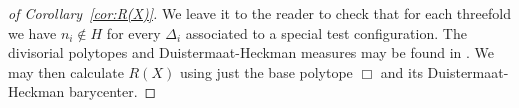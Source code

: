 \begin{proof}[of Corollary~\ref{cor:R(X)}]
We leave it to the reader to check that for each threefold we have \(n_i \notin H\) for every \(\Delta_i\) associated to a special test configuration. The divisorial polytopes and Duistermaat-Heckman measures may be found in \cite{suss2013fano}. We may then calculate \(R(X)\) using just the base polytope \(\Box\) and its Duistermaat-Heckman barycenter.
\end{proof}
